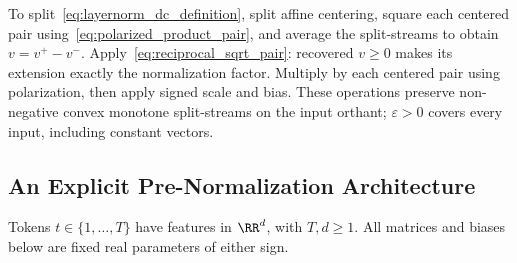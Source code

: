 To split~\eqref{eq:layernorm_dc_definition}, split affine centering, square each centered pair using~\eqref{eq:polarized_product_pair}, and average the split-streams to obtain $v=v^+-v^-$. Apply~\eqref{eq:reciprocal_sqrt_pair}: recovered $v\ge0$ makes its extension exactly the normalization factor. Multiply by each centered pair using polarization, then apply signed scale and bias. These operations preserve non-negative convex monotone split-streams on the input orthant; $\varepsilon>0$ covers every input, including constant vectors.

\subsection{An Explicit Pre-Normalization Architecture}

Tokens $t\in\{1,\dots,T\}$ have features in $\RR^d$, with $T,d\ge1$. All matrices and biases below are fixed real parameters of either sign.

